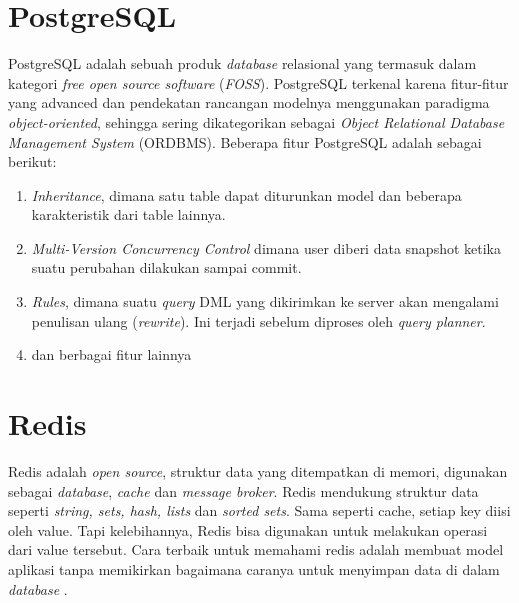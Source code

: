 	\section{PostgreSQL}
	PostgreSQL adalah sebuah produk \textit{database} relasional yang termasuk dalam kategori \textit{free open source software} (\textit{FOSS}). 
	PostgreSQL terkenal karena fitur-fitur yang advanced dan pendekatan rancangan modelnya menggunakan paradigma \textit{object-oriented}, sehingga sering dikategorikan sebagai \textit{Object Relational Database Management System} (ORDBMS).
	Beberapa fitur PostgreSQL adalah sebagai berikut:
	\begin{enumerate}
	   	\item \textit{Inheritance}, dimana satu table dapat diturunkan model dan beberapa karakteristik dari table lainnya.
	   	\item \textit{Multi-Version Concurrency Control} dimana user diberi data snapshot ketika suatu perubahan dilakukan sampai commit.
	   	\item \textit{Rules}, dimana suatu \textit{query} DML yang dikirimkan ke server akan mengalami penulisan ulang (\textit{rewrite}). Ini terjadi sebelum diproses oleh \textit{query planner}.
	   	\item dan berbagai fitur lainnya \cite{noauthor_postgresql_nodate}
	\end{enumerate}
	
	\section{Redis}
	Redis adalah \textit{open source}, struktur data yang ditempatkan di memori, digunakan sebagai \textit{database}, \textit{cache} dan \textit{message broker}. Redis mendukung struktur data seperti \textit{string, sets, hash, lists} dan \textit{sorted sets}. Sama seperti cache, setiap key diisi oleh value. Tapi kelebihannya, Redis bisa digunakan untuk melakukan operasi dari value tersebut. Cara terbaik untuk memahami redis adalah membuat model aplikasi tanpa memikirkan bagaimana caranya untuk menyimpan data di dalam \textit{database} \cite{yudana_redis_2015}.
	
